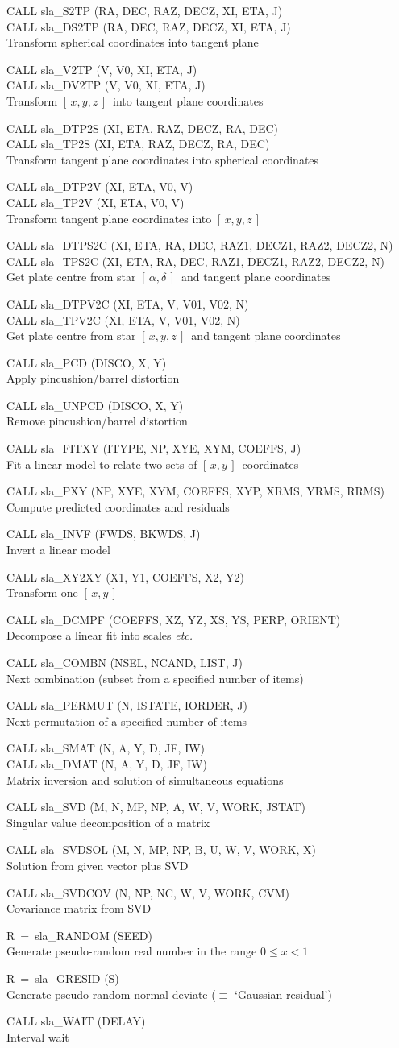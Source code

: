 \documentclass[11pt,twoside]{article}
\newcommand{\radec}     {$[\,\alpha,\delta\,]$}
\newcommand{\xy}        {$[\,x,y\,]$}
\newcommand{\xyz}       {$[\,x,y,z\,]$}
\newcommand{\callhead}[1]{\goodbreak\vspace{\bigskipamount}{\large\bf{#1}}}
\newenvironment{callset}{\begin{list}{}{\setlength{\leftmargin}{2cm}
                             \setlength{\parsep}{\smallskipamount}}}{\end{list}}
\newcommand{\subp}[1]{\item\hspace{-1cm}#1\\}
\newcommand{\subq}[2]{\item\hspace{-1cm}#1\\\hspace*{-1cm}#2\\}
\begin{document}
\callhead{Astrometry}
\begin{callset}
\subq{CALL sla\_S2TP (RA, DEC, RAZ, DECZ, XI, ETA, J)}
     {CALL sla\_DS2TP (RA, DEC, RAZ, DECZ, XI, ETA, J)}
   Transform spherical coordinates into tangent plane
\subq{CALL sla\_V2TP (V, V0, XI, ETA, J)}
     {CALL sla\_DV2TP (V, V0, XI, ETA, J)}
   Transform \xyz\ into tangent plane coordinates
\subq{CALL sla\_DTP2S (XI, ETA, RAZ, DECZ, RA, DEC)}
     {CALL sla\_TP2S (XI, ETA, RAZ, DECZ, RA, DEC)}
   Transform tangent plane coordinates into spherical coordinates
\subq{CALL sla\_DTP2V (XI, ETA, V0, V)}
     {CALL sla\_TP2V (XI, ETA, V0, V)}
   Transform tangent plane coordinates into \xyz
\subq{CALL sla\_DTPS2C (XI, ETA, RA, DEC, RAZ1, DECZ1, RAZ2, DECZ2, N)}
     {CALL sla\_TPS2C (XI, ETA, RA, DEC, RAZ1, DECZ1, RAZ2, DECZ2, N)}
   Get plate centre from star \radec\ and tangent plane coordinates
\subq{CALL sla\_DTPV2C (XI, ETA, V, V01, V02, N)}
     {CALL sla\_TPV2C (XI, ETA, V, V01, V02, N)}
   Get plate centre from star \xyz\ and tangent plane coordinates
\subp{CALL sla\_PCD (DISCO, X, Y)}
   Apply pincushion/barrel distortion
\subp{CALL sla\_UNPCD (DISCO, X, Y)}
   Remove pincushion/barrel distortion
\subp{CALL sla\_FITXY (ITYPE, NP, XYE, XYM, COEFFS, J)}
   Fit a linear model to relate two sets of \xy\ coordinates
\subp{CALL sla\_PXY (NP, XYE, XYM, COEFFS, XYP, XRMS, YRMS, RRMS)}
   Compute predicted coordinates and residuals
\subp{CALL sla\_INVF (FWDS, BKWDS, J)}
   Invert a linear model
\subp{CALL sla\_XY2XY (X1, Y1, COEFFS, X2, Y2)}
   Transform one \xy
\subp{CALL sla\_DCMPF (COEFFS, XZ, YZ, XS, YS, PERP, ORIENT)}
   Decompose a linear fit into scales {\it etc.}
\end{callset}

\callhead{Numerical Methods}
\begin{callset}
\subp{CALL sla\_COMBN (NSEL, NCAND, LIST, J)}
   Next combination (subset from a specified number of items)
\subp{CALL sla\_PERMUT (N, ISTATE, IORDER, J)}
   Next permutation of a specified number of items
\subq{CALL sla\_SMAT (N, A, Y, D, JF, IW)}
     {CALL sla\_DMAT (N, A, Y, D, JF, IW)}
   Matrix inversion and solution of simultaneous equations
\subp{CALL sla\_SVD (M, N, MP, NP, A, W, V, WORK, JSTAT)}
   Singular value decomposition of a matrix
\subp{CALL sla\_SVDSOL (M, N, MP, NP, B, U, W, V, WORK, X)}
   Solution from given vector plus SVD
\subp{CALL sla\_SVDCOV (N, NP, NC, W, V, WORK, CVM)}
   Covariance matrix from SVD
\subp{R~=~sla\_RANDOM (SEED)}
   Generate pseudo-random real number in the range {$0 \leq x < 1$}
\subp{R~=~sla\_GRESID (S)}
   Generate pseudo-random normal deviate ($\equiv$ `Gaussian residual')
\end{callset}

\callhead{Real-time}
\begin{callset}
\subp{CALL sla\_WAIT (DELAY)}
    Interval wait
\end{callset}
\end{document}
